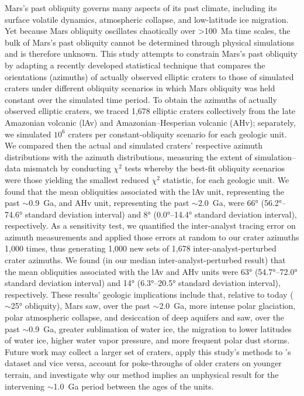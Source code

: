 \documentclass{ucetd}
\begin{document}
\abstract
Mars’s past obliquity governs many aspects of its past climate, including its surface volatile dynamics, atmospheric collapse, and low-latitude ice migration. Yet because Mars obliquity oscillates chaotically over >100~Ma time scales, the bulk of Mars’s past obliquity cannot be determined through physical simulations and is therefore unknown. This study attempts to constrain Mars’s past obliquity by adapting a recently developed statistical technique that compares the orientations (azimuths) of actually observed elliptic craters to those of simulated craters under different obliquity scenarios in which Mars obliquity was held constant over the simulated time period. To obtain the azimuths of actually observed elliptic craters, we traced 1,678 elliptic craters collectively from the late Amazonian volcanic (lAv) and Amazonian--Hesperian volcanic (AHv); separately, we simulated $10^6$ craters per constant-obliquity scenario for each geologic unit. We compared then the actual and simulated craters’ respective azimuth distributions with the azimuth distributions, measuring the extent of simulation--data mismatch by conducting $\chi^2$ tests whereby the best-fit obliquity scenarios were those yielding the smallest reduced $\chi^2$ statistic, for each geologic unit. We found that the mean obliquities associated with the lAv unit, representing the past $\sim$0.9~Ga, and AHv unit, representing the past $\sim$2.0~Ga, were 66° (56.2°--74.6° standard deviation interval) and 8° (0.0°--14.4° standard deviation interval), respectively. As a sensitivity test, we quantified the inter-analyst tracing error on azimuth measurements and applied those errors at random to our crater azimuths 1,000 times, thus generating 1,000 new sets of 1,678 inter-analyst-perturbed crater azimuths. We found (in our median inter-analyst-perturbed result) that the mean obliquities associated with the lAv and AHv units were 63° (54.7°--72.0° standard deviation interval) and 14° (6.3°--20.5° standard deviation interval), respectively. These results’ geologic implications include that, relative to today ($\sim$25° obliquity), Mars saw, over the past $\sim$2.0~Ga, more intense polar glaciation, polar atmospheric collapse, and desiccation of deep aquifers and saw, over the past $\sim$0.9~Ga, greater sublimation of water ice, the migration to lower latitudes of water ice, higher water vapor pressure, and more frequent polar dust storms. Future work may collect a larger set of craters, apply this study’s methods to \citet{holo2018a}’s dataset and vice versa, account for poke-throughs of older craters on younger terrain, and investigate why our method implies an unphysical result for the intervening $\sim$1.0~Ga period between the ages of the units.
\mainmatter
\end{document}
